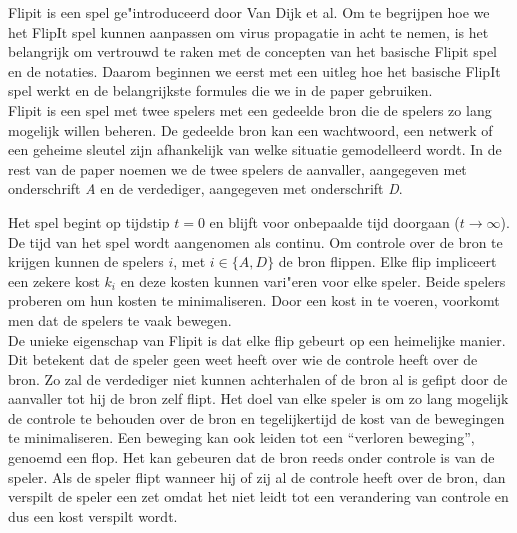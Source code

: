 \documentclass[master=cws, masteroption=vs,english]{kulemt}
\begin{document}
\begin{abstract*}
Flipit is een spel ge"introduceerd door Van Dijk et al. Om te begrijpen hoe we het FlipIt spel kunnen aanpassen om virus propagatie in acht te nemen, is het belangrijk om vertrouwd te raken met de concepten van het basische Flipit spel en de notaties. Daarom beginnen we eerst met een uitleg hoe het basische FlipIt spel werkt en de belangrijkste formules die we in de paper gebruiken. \\

Flipit is een spel met twee spelers met een gedeelde bron die de spelers zo lang mogelijk willen beheren. De gedeelde bron kan een wachtwoord, een netwerk of een geheime sleutel zijn afhankelijk van welke situatie gemodelleerd wordt. In de rest van de paper noemen we de twee spelers de aanvaller, aangegeven met onderschrift  \textit{A} en de verdediger, aangegeven met onderschrift \textit{D}.

Het spel begint op tijdstip $ t = 0 $ en blijft voor onbepaalde tijd doorgaan ($ t \rightarrow \infty $). De tijd van het spel wordt aangenomen als continu. Om controle over de bron te krijgen kunnen de spelers $i$, met $ i \in \{A, D \} $ de bron flippen. Elke flip impliceert een zekere kost $ k_{i} $ en deze kosten kunnen vari"eren voor elke speler. Beide spelers proberen om hun kosten te minimaliseren. Door een kost in te voeren, voorkomt men dat de spelers te vaak bewegen. \\

De unieke eigenschap van Flipit is dat elke flip gebeurt op een heimelijke manier. Dit betekent dat de speler geen weet heeft over wie de controle heeft over de bron. Zo zal de verdediger niet kunnen achterhalen of de bron al is gefipt door de aanvaller tot hij de bron zelf flipt. Het doel van elke speler is om zo lang mogelijk de controle te behouden over de bron en tegelijkertijd de kost van de bewegingen te minimaliseren. Een beweging kan ook leiden tot een ``verloren beweging'', genoemd een flop. Het kan gebeuren dat de bron reeds onder controle is van de speler. Als de speler flipt wanneer hij of zij al de controle  heeft over de bron, dan verspilt de speler een zet omdat het niet leidt tot een verandering van controle en dus een kost verspilt wordt. \\



\end{abstract*}
\end{document}
